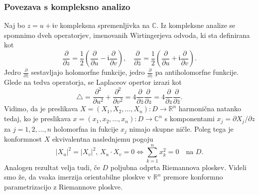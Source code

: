 \documentclass[8pt]{beamer}
\theoremstyle{definition}
\theoremstyle{remark}
\theoremstyle{plain}
\numberwithin{equation}{section}  %
\begin{document}
\begin{frame}
    \frametitle{Povezava s kompleksno analizo}

    Naj bo $z=u+\mathfrak{i} v$ kompleksna spremenljivka na $\mathbb{C}$. Iz kompleksne analize se spomnimo dveh operatorjev, imenovanih \textcolor{red1}{Wirtingerjeva odvoda}, ki sta definirana kot
    \begin{equation*}
        \frac{\partial}{\partial z}=\frac{1}{2}\left(\frac{\partial}{\partial u}-\mathfrak{i} \frac{\partial}{\partial v}\right), \quad \frac{\partial}{\partial \bar{z}}=\frac{1}{2}\left(\frac{\partial}{\partial u}+\mathfrak{i} \frac{\partial}{\partial v}\right).
    \end{equation*}
    Jedro $\frac{\partial}{\partial \bar{z}}$ sestavljajo holomorfne funkcije, jedro $\frac{\partial}{\partial z}$ pa antiholomorfne funkcije. Glede na tedva operatorja, se Laplaceov opertor izrazi kot 
    \begin{equation*}
        \bigtriangleup=\frac{\partial^2}{\partial u^2}+\frac{\partial^2}{\partial v^2}=4 \frac{\partial}{\partial \bar{z}} \frac{\partial}{\partial z}=4 \frac{\partial}{\partial z} \frac{\partial}{\partial \bar{z}} .
    \end{equation*} 
    Vidimo, da je preslikava $X=(X_1, X_2, \ldots, X_n): D \rightarrow \mathbb{R}^n$ harmonična natanko tedaj, ko je preslikava $x=\left(x_1, x_2, \ldots, x_n\right): D \rightarrow \mathbb{C}^n$ s komponentami $x_j=\partial X_j / \partial z$ za $j=1,2, \ldots, n$ holomorfna in fukcije $x_j$ nimajo skupne ničle. Poleg tega je konformnost $X$ ekvivalentna naslednjemu pogoju
    \begin{equation*}
        \left| X_u \right|^2 = \left| X_v \right|^2, \, X_u\cdot X_v=0 \iff \sum_{k=1}^n x_k^2 = 0 \quad \text{na }D.
    \end{equation*}
    Analogen rezultat velja tudi, če $D$ poljubna \textcolor{red1}{odprta Riemannova ploskev}. Videli smo že, da vsaka imerzija orientabilne ploskve v $\mathbb{R}^n$ premore konformno parametrizacijo z Riemannove ploskve. 

\end{frame}
\end{document}
